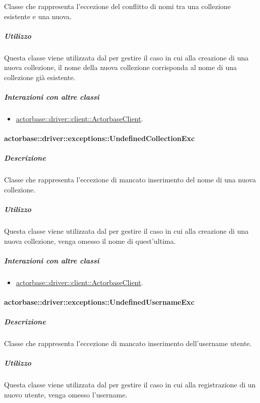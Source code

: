 \documentclass{scalatekids-article}
\begin{document}
Classe che rappresenta l'eccezione del conflitto di nomi tra una collezione esistente e una nuova.

\subparagraph{Utilizzo}

Questa classe viene utilizzata dal  per gestire il caso in cui alla creazione di una nuova collezione, il nome della nuova collezione corrisponda al nome di una collezione già esistente.

\subparagraph{Interazioni con altre classi}

\begin{itemize}
\item \hyperref[sec:actorbase::driver::client::ActorbaseClient]{actorbase::driver::client::ActorbaseClient}.
\end{itemize}

\paragraph{actorbase::driver::exceptions::UndefinedCollectionExc}

\subparagraph{Descrizione}

Classe che rappresenta l'eccezione di mancato inserimento del nome di una nuova collezione.

\subparagraph{Utilizzo}

Questa classe viene utilizzata dal  per gestire il caso in cui alla creazione di una nuova collezione, venga omesso il nome di quest'ultima.

\subparagraph{Interazioni con altre classi}

\begin{itemize}
\item \hyperref[sec:actorbase::driver::client::ActorbaseClient]{actorbase::driver::client::ActorbaseClient}.
\end{itemize}

\paragraph{actorbase::driver::exceptions::UndefinedUsernameExc}

\subparagraph{Descrizione}

Classe che rappresenta l'eccezione di mancato inserimento dell'username utente.

\subparagraph{Utilizzo}

Questa classe viene utilizzata dal  per gestire il caso in cui alla registrazione di un nuovo utente, venga omesso l'username.
\end{document}
